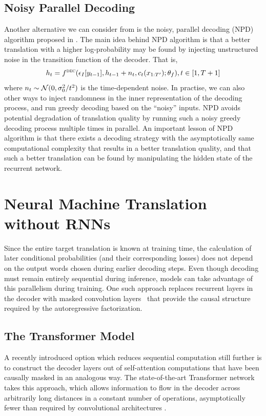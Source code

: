 \subsection{Noisy Parallel Decoding}
Another alternative we can consider from is the noisy, parallel decoding (NPD) algorithm proposed in . The main idea behind NPD algorithm is that a better translation with a higher log-probability may be found by injecting unstructured noise in the transition function of the decoder. That is,
\begin{equation}
h_t = f^{\textsc{dec}}(\epsilon_I[y_{t-1}], h_{t-1} + n_t, c_t(x_{1:T'}); \theta_f), t\in [1, T+1]
\end{equation}
where $n_t \sim \mathcal{N}(0, {\sigma_0^2} \large / {t^2})$ is the time-dependent noise. In practise, we can also other ways to inject randomness in the inner representation of the decoding process, and run greedy decoding based on the ``noisy'' inputs. 
NPD avoids potential degradation of translation quality by running such a noisy greedy decoding process multiple times in parallel. An important lesson of NPD algorithm is that there exists a decoding strategy with the asymptotically same computational complexity that results in a better translation quality, and that such a better translation can be found by manipulating the hidden state of the recurrent network. 

\section{Neural Machine Translation without RNNs}
Since the entire target translation is known at training time, the calculation of later conditional probabilities (and their corresponding losses) does not depend on the output words chosen during earlier decoding steps. 
Even though decoding must remain entirely sequential during inference, models can take advantage of this parallelism during training.
One such approach replaces recurrent layers in the decoder with masked convolution layers~ that provide the causal structure required by the autoregressive factorization.


\subsection{The Transformer Model}
A recently introduced option which reduces sequential computation still further is to construct the decoder layers out of self-attention computations that have been causally masked in an analogous way.
The state-of-the-art Transformer network takes this approach, which allows information to flow in the decoder across arbitrarily long distances in a constant number of operations, asymptotically fewer than required by convolutional architectures \citep{vaswani2017attention}.
